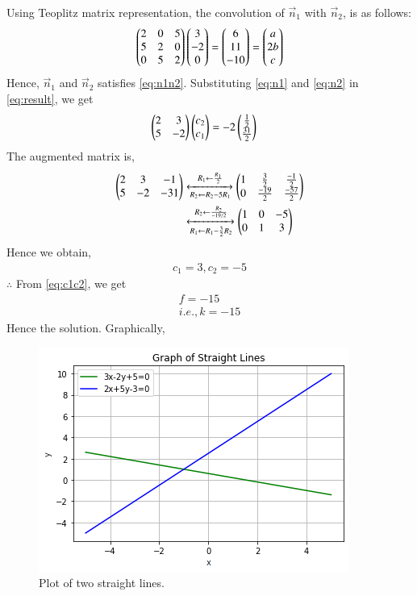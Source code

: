 \documentclass[journal,12pt,twocolumn]{IEEEtran}
\begin{document}
Using Teoplitz matrix representation, the convolution of $\vec{n}_1$ with $\vec{n}_2$, is as follows:
\begin{align}
	\begin{pmatrix}2 & 0 & 5\\ 5 & 2 & 0\\ 0 & 5 & 2\end{pmatrix}\begin{pmatrix}3\\-2\\0\end{pmatrix} = \begin{pmatrix}6 \\11 \\ -10\end{pmatrix} = \begin{pmatrix}a \\ 2b \\ c\end{pmatrix}
\end{align}
Hence, $\vec{n}_1$ and $\vec{n}_2$ satisfies \eqref{eq:n1n2}.
Substituting \eqref{eq:n1} and \eqref{eq:n2} in \eqref{eq:result}, we get
\begin{align}
       \begin{pmatrix}2 & 3\\ 5 & -2\end{pmatrix}\begin{pmatrix}c_2 \\ c_1\end{pmatrix} &= -2\begin{pmatrix}\frac{1}{2} \\ \frac{31}{2}\end{pmatrix}
\end{align}
The augmented matrix is,
\begin{align}
    \begin{pmatrix}2 & 3 & -1\\ 5 & -2 & -31\end{pmatrix} &\xleftrightarrow[R_2 \leftarrow R_2 - 5R_1]{R_1 \leftarrow \frac{R_1}{2}} \begin{pmatrix}1 & \frac{3}{2}  & \frac{-1}{2} \\ 0 & \frac{-19}{2} & \frac{-57}{2}\end{pmatrix} \\
	&\xleftrightarrow[R_1 \leftarrow R_1 - \frac{3}{2}R_2]{R_2 \leftarrow \frac{R_2}{-19/2}} \begin{pmatrix}1 & 0 & -5\\0 & 1 & 3\end{pmatrix}
\end{align}
Hence we obtain,
\begin{align}
	c_1 = 3, c_2 = -5
\end{align}
$\therefore$ From \eqref{eq:c1c2}, we get
\begin{align}
	f = -15\\
	i.e., \boxed{k = -15} \label{eq:kval}
\end{align}
Hence the solution.
Graphically,
\renewcommand{\thefigure}{\arabic{figure}}
\begin{figure}[!ht] \label{fig:straight_lines}
	\centering
	\includegraphics[width=\columnwidth]{a6_graph.png}
	\caption{Plot of two straight lines.}
\end{figure}
\end{document}
